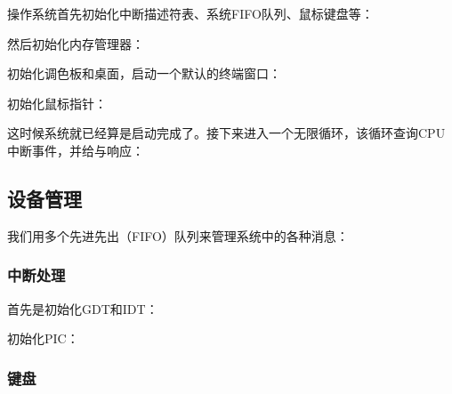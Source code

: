 
{\linespread{1}}

操作系统首先初始化中断描述符表、系统FIFO队列、鼠标键盘等：
{\linespread{1}}

然后初始化内存管理器：
{\linespread{1}}

初始化调色板和桌面，启动一个默认的终端窗口：
{\linespread{1}}

初始化鼠标指针：
{\linespread{1}}

这时候系统就已经算是启动完成了。接下来进入一个无限循环，该循环查询CPU中断事件，并给与响应：
{\linespread{1}}

\subsection{设备管理}
\label{sub:设备管理}

我们用多个先进先出（FIFO）队列来管理系统中的各种消息：
{\linespread{1}}
{\linespread{1}}

\subsubsection{中断处理}
\label{subs:中断处理}

{\linespread{1}}

首先是初始化GDT和IDT：
{\linespread{1}}

初始化PIC：
{\linespread{1}}

\subsubsection{键盘}
\label{subs:键盘}


